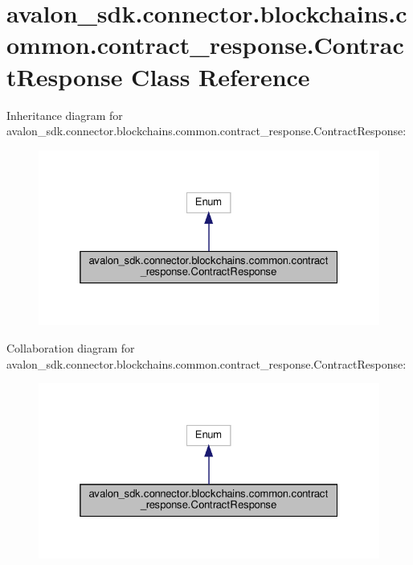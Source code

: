 \hypertarget{classavalon__sdk_1_1connector_1_1blockchains_1_1common_1_1contract__response_1_1ContractResponse}{}\section{avalon\+\_\+sdk.\+connector.\+blockchains.\+common.\+contract\+\_\+response.\+Contract\+Response Class Reference}
\label{classavalon__sdk_1_1connector_1_1blockchains_1_1common_1_1contract__response_1_1ContractResponse}


Inheritance diagram for avalon\+\_\+sdk.\+connector.\+blockchains.\+common.\+contract\+\_\+response.\+Contract\+Response\+:
\nopagebreak
\begin{figure}[H]
\begin{center}
\leavevmode
\includegraphics[width=325pt]{classavalon__sdk_1_1connector_1_1blockchains_1_1common_1_1contract__response_1_1ContractResponse__inherit__graph}
\end{center}
\end{figure}


Collaboration diagram for avalon\+\_\+sdk.\+connector.\+blockchains.\+common.\+contract\+\_\+response.\+Contract\+Response\+:
\nopagebreak
\begin{figure}[H]
\begin{center}
\leavevmode
\includegraphics[width=325pt]{classavalon__sdk_1_1connector_1_1blockchains_1_1common_1_1contract__response_1_1ContractResponse__coll__graph}
\end{center}
\end{figure}
